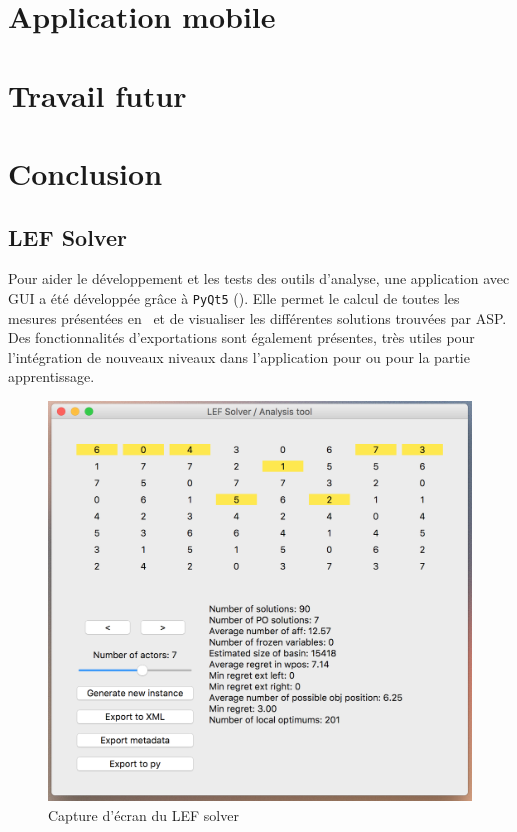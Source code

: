 \documentclass[a4paper, 11pt, titlepage]{article}
\begin{document}
	\section{Application mobile}
	    \label{app}
	    
	    
	\section{Travail futur}
	
	
	\section{Conclusion}
	
%	
    \printbibliography[heading=bibintoc]
    \begin{appendix}
        \section{LEF Solver}
Pour aider le développement et les tests des outils d'analyse, une application avec GUI a été développée grâce à \texttt{PyQt5} (). Elle permet le calcul de toutes les mesures présentées en~ et de visualiser les différentes solutions trouvées par ASP. Des fonctionnalités d'exportations sont également présentes, très utiles pour l'intégration de nouveaux niveaux dans l'application pour ou pour la partie apprentissage.

\begin{figure}[ht!]
\centering
\includegraphics[width=0.7\linewidth]{lefsolver}
\caption{Capture d'écran du LEF solver}
\label{fig-lefsolver}
\end{figure}
        

\end{appendix}
\end{document}
